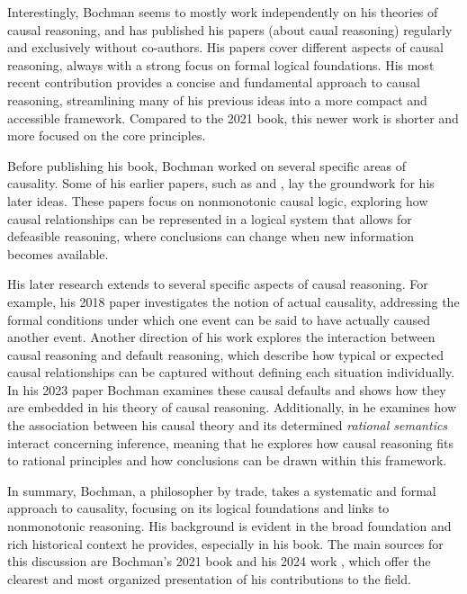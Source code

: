 \documentclass[seminar,palatino,english]{AIGpaper}
\begin{document}
Interestingly, Bochman seems to mostly work independently on his theories of causal reasoning, and has published his papers (about caual reasoning) regularly and exclusively without co-authors. His papers cover different aspects of causal reasoning, always with a strong focus on formal logical foundations. His most recent contribution \cite{bochman_causal_2024} provides a concise and fundamental approach to causal reasoning, streamlining many of his previous ideas into a more compact and accessible framework. Compared to the 2021 book, this newer work is shorter and more focused on the core principles.

Before publishing his book, Bochman worked on several specific areas of causality. Some of his earlier papers, such as \cite{bochman_logic_2003} and \cite{bochman_causal_2004}, lay the groundwork for his later ideas. These papers focus on nonmonotonic causal logic, exploring how causal relationships can be represented in a logical system that allows for \glqq{}defeasible reasoning\grqq{}\cite{bochman_causal_2024}, where conclusions can change when new information becomes available.

His later research extends to several specific aspects of causal reasoning. For example, his 2018 paper \cite{bochman_actual_2018} investigates the notion of \glqq{}actual causality\grqq{}, addressing the formal conditions under which one event can be said to have \glqq{}actually\grqq{} caused another event. Another direction of his work explores the interaction between causal reasoning and default reasoning, which describe how typical or expected causal relationships can be captured without defining each situation individually. In his 2023 paper \cite{bochman_default_2023} Bochman examines these causal defaults and shows how they are embedded in his theory of causal reasoning. Additionally, in \cite{bochman_inferential_2023} he examines how the association between his causal theory and its determined \emph{rational semantics} interact concerning inference, meaning that he explores how causal reasoning fits to rational principles and how conclusions can be drawn within this framework. 

In summary, Bochman, a philosopher by trade, takes a systematic and formal approach to causality, focusing on its logical foundations and links to nonmonotonic reasoning. His background is evident in the broad foundation and rich historical context he provides, especially in his book. The main sources for this discussion are Bochman’s 2021 book \cite{bochman_logical_2021} and his 2024 work \cite{bochman_causal_2024}, which offer the clearest and most organized presentation of his contributions to the field.
\end{document}
